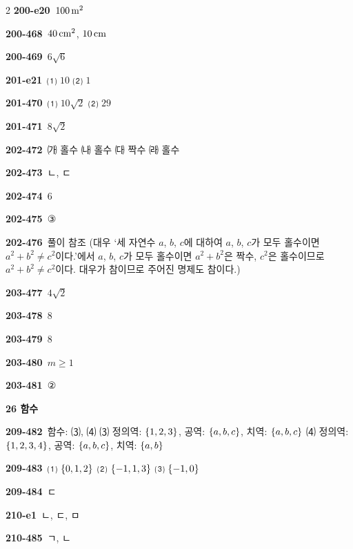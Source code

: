 \documentclass[10pt,a4paper]{article}
\begin{document}
\begin{multicols}{2}
\noindent\textbf{200-e20}\ $100\mkern3mu \mathrm{m}^2$\par
\noindent\textbf{200-468}\ $40\mkern3mu \mathrm{cm}^2$, $10\mkern3mu \mathrm{cm}$\par
\noindent\textbf{200-469}\ $6\sqrt{6}$\par
\noindent\textbf{201-e21}\ ⑴ $10$ ⑵ $1$\par
\noindent\textbf{201-470}\ ⑴ $10\sqrt{2}$ ⑵ $29$\par
\noindent\textbf{201-471}\ $8\sqrt{2}$\par
\noindent\textbf{202-472}\ ㈎ 홀수 ㈏ 홀수 ㈐ 짝수 ㈑ 홀수\par
\noindent\textbf{202-473}\ ㄴ, ㄷ\par
\noindent\textbf{202-474}\ $6$\par
\noindent\textbf{202-475}\ ③\par
\noindent\textbf{202-476}\ 풀이 참조 (대우 ‘세 자연수 $a$, $b$, $c$에 대하여 $a$, $b$, $c$가 모두 홀수이면 $a^2+b^2\ne c^2$이다.’에서 $a$, $b$, $c$가 모두 홀수이면 $a^2+b^2$은 짝수, $c^2$은 홀수이므로 $a^2+b^2\ne c^2$이다. 대우가 참이므로 주어진 명제도 참이다.)\par
\noindent\textbf{203-477}\ $4\sqrt{2}$\par
\noindent\textbf{203-478}\ $8$\par
\noindent\textbf{203-479}\ $8$\par
\noindent\textbf{203-480}\ $m\ge 1$\par
\noindent\textbf{203-481}\ ②\par
\noindent\textbf{26 함수}\par\smallskip
\noindent\textbf{209-482}\ 함수: ⑶, ⑷ \quad ⑶ 정의역: $\{1{,}\mkern3mu\mathopen{}2{,}\mkern3mu\mathopen{}3\}$, 공역: $\{a{,}\mkern3mu\mathopen{}b{,}\mkern3mu\mathopen{}c\}$, 치역: $\{a{,}\mkern3mu\mathopen{}b{,}\mkern3mu\mathopen{}c\}$ \quad ⑷ 정의역: $\{1{,}\mkern3mu\mathopen{}2{,}\mkern3mu\mathopen{}3{,}\mkern3mu\mathopen{}4\}$, 공역: $\{a{,}\mkern3mu\mathopen{}b{,}\mkern3mu\mathopen{}c\}$, 치역: $\{a{,}\mkern3mu\mathopen{}b\}$\par
\noindent\textbf{209-483}\ ⑴ $\{0{,}\mkern3mu\mathopen{}1{,}\mkern3mu\mathopen{}2\}$ ⑵ $\{-1{,}\mkern3mu\mathopen{}1{,}\mkern3mu\mathopen{}3\}$ ⑶ $\{-1{,}\mkern3mu\mathopen{}0\}$\par
\noindent\textbf{209-484}\ ㄷ\par
\noindent\textbf{210-e1}\ ㄴ, ㄷ, ㅁ\par
\noindent\textbf{210-485}\ ㄱ, ㄴ\par

\end{multicols}
\end{document}
